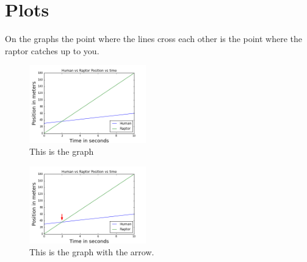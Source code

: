 \documentclass[twocolumn]{revtex4}
\begin{document}
\section{Plots}
On the graphs the point where the lines cross each other is the point where the raptor catches up to you.
\begin{figure}[h]
	\centering
	\includegraphics[width=0.45\textwidth]{RaptorVsHuman.png}
	\caption{This is the graph \label{fig:Graph}}
\end{figure}

\begin{figure}[h]
	\centering
	\includegraphics[width=0.45\textwidth]{Arrows.png}
	\caption{This is the graph with the arrow. \label{fig:Graph}}
\end{figure}


\end{document}
